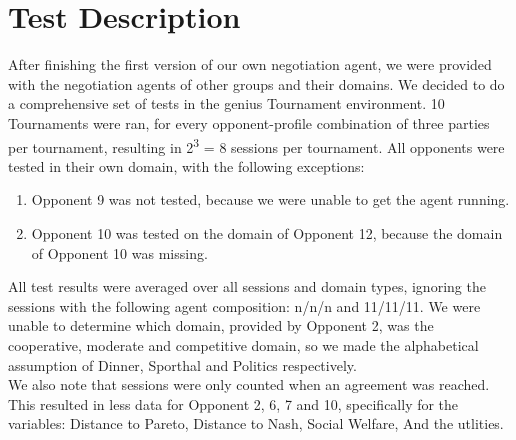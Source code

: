 \section{Test Description}

After finishing the first version of our own negotiation agent, we were provided with the negotiation agents of other groups and their domains. We decided to do a comprehensive set of tests in the genius Tournament environment. 10 Tournaments were ran, for every opponent-profile combination of three parties per tournament, resulting in 2\textsuperscript{3} = 8 sessions per tournament. All opponents were tested in their own domain, with the following exceptions:

\begin{enumerate}
	\item Opponent 9 was not tested, because we were unable to get the agent running. 
	\item Opponent 10 was tested on the domain of Opponent 12, because the domain of Opponent 10 was missing.
\end{enumerate}

All test results were averaged over all sessions and domain types, ignoring the sessions with the following agent composition: n/n/n and 11/11/11.
We were unable to determine which domain, provided by Opponent 2, was the cooperative, moderate and competitive domain, so we made the alphabetical assumption of Dinner, Sporthal and Politics respectively.\\

We also note that sessions were only counted when an agreement was reached. This resulted in less data for Opponent 2, 6, 7 and 10, specifically for the variables: Distance to Pareto, Distance to Nash, Social Welfare, And the utlities.